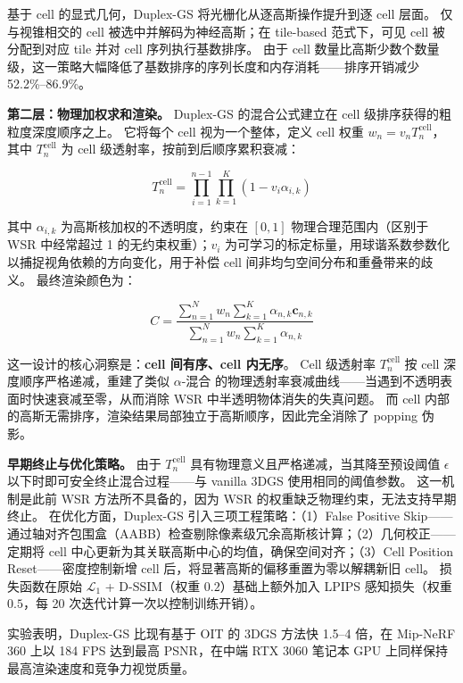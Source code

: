 基于 cell 的显式几何，Duplex-GS 将光栅化从逐高斯操作提升到逐 cell 层面。
仅与视锥相交的 cell 被选中并解码为神经高斯；在 tile-based 范式下，可见 cell 被分配到对应 tile 并对 cell 序列执行基数排序。
由于 cell 数量比高斯少数个数量级，这一策略大幅降低了基数排序的序列长度和内存消耗——排序开销减少 52.2\%--86.9\%。

\textbf{第二层：物理加权求和渲染。}
Duplex-GS 的混合公式建立在 cell 级排序获得的粗粒度深度顺序之上。
它将每个 cell 视为一个整体，定义 cell 权重 $w_n = v_n T_n^{\mathrm{cell}}$，其中 $T_n^{\mathrm{cell}}$ 为 cell 级透射率，按前到后顺序累积衰减：

\begin{equation}
T_n^{\mathrm{cell}} = \prod_{i=1}^{n-1}\prod_{k=1}^{K}(1 - v_i \alpha_{i,k})
\end{equation}

其中 $\alpha_{i,k}$ 为高斯核加权的不透明度，约束在 $[0,1]$ 物理合理范围内（区别于 WSR 中经常超过 1 的无约束权重）；$v_i$ 为可学习的标定标量，用球谐系数参数化以捕捉视角依赖的方向变化，用于补偿 cell 间非均匀空间分布和重叠带来的歧义。
最终渲染颜色为：

\begin{equation}
C = \frac{\sum_{n=1}^{N} w_n \sum_{k=1}^{K} \alpha_{n,k} \mathbf{c}_{n,k}}{\sum_{n=1}^{N} w_n \sum_{k=1}^{K} \alpha_{n,k}}
\end{equation}

这一设计的核心洞察是：\textbf{cell 间有序、cell 内无序}。
Cell 级透射率 $T_n^{\mathrm{cell}}$ 按 cell 深度顺序严格递减，重建了类似 $\alpha$-混合 的物理透射率衰减曲线——当遇到不透明表面时快速衰减至零，从而消除 WSR 中半透明物体消失的失真问题。
而 cell 内部的高斯无需排序，渲染结果局部独立于高斯顺序，因此完全消除了 popping 伪影。

\textbf{早期终止与优化策略。}
由于 $T_n^{\mathrm{cell}}$ 具有物理意义且严格递减，当其降至预设阈值 $\epsilon$ 以下时即可安全终止混合过程——与 vanilla 3DGS 使用相同的阈值参数。
这一机制是此前 WSR 方法所不具备的，因为 WSR 的权重缺乏物理约束，无法支持早期终止。
在优化方面，Duplex-GS 引入三项工程策略：（1）False Positive Skip——通过轴对齐包围盒（AABB）检查剔除像素级冗余高斯核计算；（2）几何校正——定期将 cell 中心更新为其关联高斯中心的均值，确保空间对齐；（3）Cell Position Reset——密度控制新增 cell 后，将显著高斯的偏移重置为零以解耦新旧 cell。
损失函数在原始 $\mathcal{L}_1$ + D-SSIM（权重 $0.2$）基础上额外加入 LPIPS 感知损失（权重 $0.5$，每 20 次迭代计算一次以控制训练开销）。

实验表明，Duplex-GS 比现有基于 OIT 的 3DGS 方法快 1.5--4 倍，在 Mip-NeRF 360 上以 184 FPS 达到最高 PSNR，在中端 RTX 3060 笔记本 GPU 上同样保持最高渲染速度和竞争力视觉质量。


